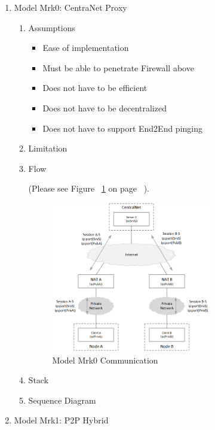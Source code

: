 \begin{enumerate}

\item Model Mrk0: CentraNet Proxy

\begin{enumerate}

\item Assumptions

\begin{itemize}

\item Ease of implementation
\item Must be able to penetrate Firewall above
\item Does not have to be efficient
\item Does not have to be decentralized
\item Does not have to support End2End pinging

\end{itemize}

\item Limitation

\item Flow

(Please see Figure ~\ref{fig:MM0C} on page ~\pageref{fig:MM0C}).

\begin{figure}[H]
    \centering
    \includegraphics[width=7cm,angle=0]{./diag/Issue/NATRelaying-Mk0-Issue.png}
	\caption{Model Mrk0 Communication}
    \label{fig:MM0C}
\end{figure}

\item Stack

\item Sequence Diagram

\end{enumerate}

\item Model Mrk1: P2P Hybrid


\end{enumerate}
